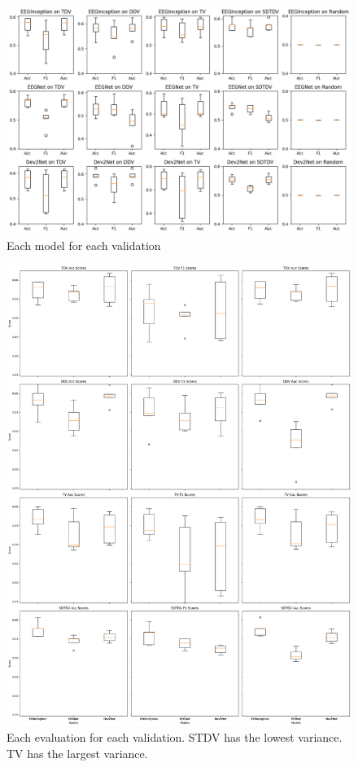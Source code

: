 \documentclass{ieeeaccess}
\begin{document}
\begin{figure}[tb]
    \centering
    \includegraphics[width=\linewidth]{各日時各モデルごとの箱ひげ図.png}
    \caption{Each model for each validation}
    \label{fig: Each model for each validation}
\end{figure}
\begin{figure}[tb]
    \centering
    \includegraphics[width=\linewidth,height=0.95\textheight]{COMPARISON RESULTS FOR THE LEARNING CONDITION .png}
    \caption{Each evaluation for each validation.
    STDV has the lowest variance.
    TV has the largest variance.}
    \label{fig: Each evaluation  for each validation}
\end{figure}
\end{document}
